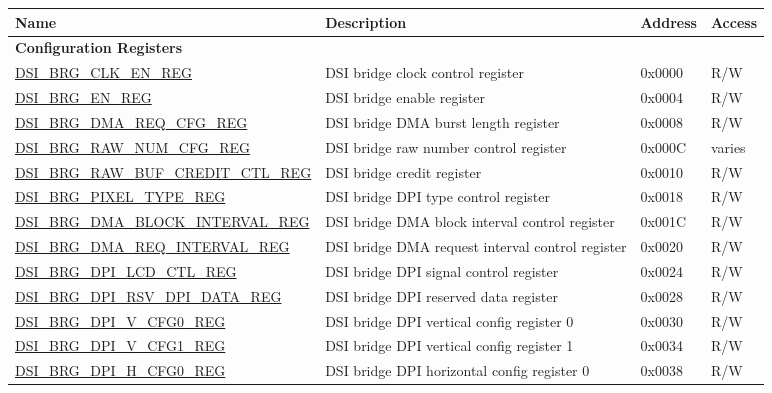 \begin{longtable}{ | p{6.8cm} | p{6.5cm} | p{1.2cm} | p{1cm} | }
\hline\rowcolor{lightgray}
Name & Description &  Address & Access \\ \hline
\endhead
\multicolumn{4}{|l|}{\textbf{Configuration Registers}} \\ \hline
\hyperref[regdesc:DSIBRGCLKENREG]{DSI\_BRG\_CLK\_EN\_REG} & DSI bridge clock control register & 0x0000 & R/W \\ \hline
\hyperref[regdesc:DSIBRGENREG]{DSI\_BRG\_EN\_REG} & DSI bridge enable register & 0x0004 & R/W \\ \hline
\hyperref[regdesc:DSIBRGDMAREQCFGREG]{DSI\_BRG\_DMA\_REQ\_CFG\_REG} & DSI bridge DMA burst length register & 0x0008 & R/W \\ \hline
\hyperref[regdesc:DSIBRGRAWNUMCFGREG]{DSI\_BRG\_RAW\_NUM\_CFG\_REG} & DSI bridge raw number control register & 0x000C & varies \\ \hline
\hyperref[regdesc:DSIBRGRAWBUFCREDITCTLREG]{DSI\_BRG\_RAW\_BUF\_CREDIT\_CTL\_REG} & DSI bridge credit register & 0x0010 & R/W \\ \hline
\hyperref[regdesc:DSIBRGPIXELTYPEREG]{DSI\_BRG\_PIXEL\_TYPE\_REG} & DSI bridge DPI type control register & 0x0018 & R/W \\ \hline
\hyperref[regdesc:DSIBRGDMABLOCKINTERVALREG]{DSI\_BRG\_DMA\_BLOCK\_INTERVAL\_REG} & DSI bridge DMA block interval control register & 0x001C & R/W \\ \hline
\hyperref[regdesc:DSIBRGDMAREQINTERVALREG]{DSI\_BRG\_DMA\_REQ\_INTERVAL\_REG} & DSI bridge DMA request interval control register & 0x0020 & R/W \\ \hline
\hyperref[regdesc:DSIBRGDPILCDCTLREG]{DSI\_BRG\_DPI\_LCD\_CTL\_REG} & DSI bridge DPI signal control register & 0x0024 & R/W \\ \hline
\hyperref[regdesc:DSIBRGDPIRSVDPIDATAREG]{DSI\_BRG\_DPI\_RSV\_DPI\_DATA\_REG} & DSI bridge DPI reserved data register & 0x0028 & R/W \\ \hline
\hyperref[regdesc:DSIBRGDPIVCFG0REG]{DSI\_BRG\_DPI\_V\_CFG0\_REG} & DSI bridge DPI vertical config register 0 & 0x0030 & R/W \\ \hline
\hyperref[regdesc:DSIBRGDPIVCFG1REG]{DSI\_BRG\_DPI\_V\_CFG1\_REG} & DSI bridge DPI vertical config register 1 & 0x0034 & R/W \\ \hline
\hyperref[regdesc:DSIBRGDPIHCFG0REG]{DSI\_BRG\_DPI\_H\_CFG0\_REG} & DSI bridge DPI horizontal config register 0 & 0x0038 & R/W \\ \hline

\end{longtable}
